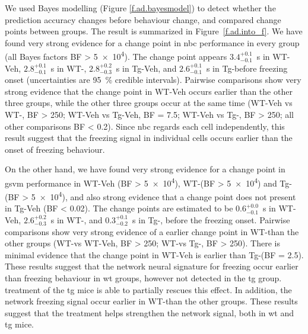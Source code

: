 We used Bayes modelling (Figure \ref{f.ad.bayesmodel}) to detect whether the prediction accuracy changes before behaviour change, and compared change points between groups. The result is summarized in Figure~\ref{f.ad.into_f}. We have found very strong evidence for a change point in \gls{nbc} performance in every group (all Bayes factors BF > \num{5e4}). The change point appears $3.4_{-0.1}^{+0.1}$\SI{}{\s} in WT-Veh, $2.8_{-0.1}^{+0.1}$\SI{}{\second} in WT-\glu, $2.8_{-0.3}^{+0.2}$\SI{}{\second} in Tg-Veh, and $2.6_{-0.1}^{+0.1}$\SI{}{\second} in Tg-\glu before freezing onset (uncertainties are \SI{95}{\percent} credible intervals). Pairwise comparisons show very strong evidence that the change point in WT-Veh occurs earlier than the other three groups, while the other three groups occur at the same time (WT-Veh vs WT-\glu, BF > \num{250}; WT-Veh vs Tg-Veh, BF = \num{7.5}; WT-Veh vs Tg-\glu, BF > \num{250}; all other comparisons BF < \num{0.2}). Since \gls{nbc} regards each cell independently, this result suggest that the freezing signal in individual cells occurs earlier than the onset of freezing behaviour.

On the other hand,  we have found very strong evidence for a change point in \gls{gsvm} performance in WT-Veh (BF > \num{5e4}), WT-\glu (BF > \num{5e4}) and Tg-\glu (BF > \num{5e4}), and also strong evidence that a change point does not present in Tg-Veh (BF < \num{0.02}). The change points are estimated to be $0.6_{-0.1}^{+0.0}$\SI{}{\s} in WT-Veh, $2.6_{-0.3}^{+0.2}$\SI{}{\second} in WT-\glu, and $0.3_{-0.2}^{+0.1}$\SI{}{\s} in Tg-\glu, before the freezing onset. Pairwise comparisons show very strong evidence of a earlier change point in WT-\glu than the other groups (WT-\glu vs WT-Veh, BF > \num{250}; WT-\glu vs Tg-\glu, BF > \num{250}). There is minimal evidence that the change point in WT-Veh is earlier than Tg-\glu (BF = \num{2.5}). These results suggest that the network neural signature for freezing occur earlier than freezing behaviour in \gls{wt} groups, however not detected in the \gls{tg} group. \tglu treatment of the \gls{tg} mice is able to partially rescues this effect. In addition, the network freezing signal occur earlier in WT-\glu than the other groups. These results suggest that the \tglu treatment helps strengthen the network signal, both in \gls{wt} and \gls{tg} mice.  


